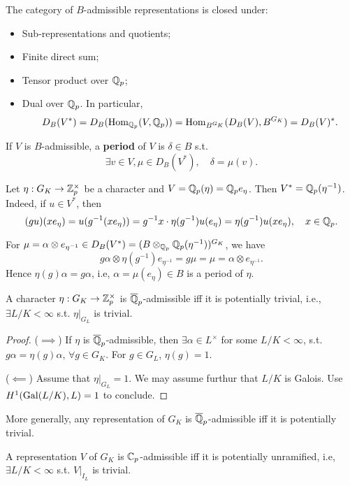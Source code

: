 The category of $B$-admissible representations is closed under:\begin{itemize}
\item Sub-representations and quotients;
\item Finite direct sum;
\item Tensor product over $\mathbb{Q}_p$;
\item Dual over $\mathbb{Q}_p$. In particular, \[D_B(V^*) = D_B(\operatorname{Hom}_{\mathbb{Q}_p}(V, \mathbb{Q}_p)) =\operatorname{Hom}_{B^{G_K}}(D_B(V), B^{G_K}) = D_B(V)^*.\]
\end{itemize}

If $V$ is $B$-admissible, a \textbf{period} of $V$ is $\delta\in B$ s.t. \[\exists v\in V, \mu\in D_B(V^*),\quad \delta = \mu(v).\]
\begin{example}
    Let $\eta : G_K\to\mathbb{Z}_p^{\times}$ be a character and $V = \mathbb{Q}_p(\eta) = \mathbb{Q}_pe_\eta$.
    Then $V^* = \mathbb{Q}_p(\eta^{-1})$.
    Indeed, if $u\in V^*$, then
    \[(gu)(xe_\eta) = u(g^{-1}(x e_\eta))
    = g^{-1}x\cdot \eta(g^{-1})u(e_\eta)=\eta(g^{-1})u(xe_\eta),\quad x\in \mathbb{Q}_p.\]

    For $\mu = \alpha\otimes e_{\eta^{-1}}\in D_B(V^*) = (B\otimes_{\mathbb{Q}_p} \mathbb{Q}_p(\eta^{-1}))^{G_K}$,
    we have \[
    g\alpha\otimes \eta(g^{-1})e_{\eta^{-1}} = g\mu
    = \mu = \alpha\otimes e_{\eta^{-1}}.\]
    Hence $\eta(g)\alpha = g\alpha$,
    i.e, $\alpha = \mu(e_\eta)\in B$ is a period of $\eta$. 
\end{example}

\begin{proposition}
    A character $\eta : G_K\to\mathbb{Z}_p^\times$ is $\overline{\mathbb{Q}}_p$-admissible iff it is potentially trivial, i.e., $\exists L/K<\infty$ s.t. $\eta|_{G_L}$ is trivial.
\end{proposition}
\begin{proof}
    ($\implies$) If $\eta$ is $\overline{\mathbb{Q}}_p$-admissible,
    then $\exists \alpha\in L^\times$ for some $L/K<\infty$, s.t. $g\alpha = \eta(g)\alpha$,
    $\forall g\in G_K$.
    For $g\in G_L$, $\eta(g) = 1$.

    ($\impliedby$) Assume that $\eta|_{G_L} = 1$.
    We may assume furthur that $L/K$ is Galois.
    Use $H^1(\operatorname{Gal}(L/K), L) = 1$ to conclude.
\end{proof}
More generally, any representation of $G_K$ is $\overline{\mathbb{Q}}_p$-admissible iff it is potentially trivial.

\begin{theorem}[Sen]
    A representation $V$ of $G_K$ is $\mathbb{C}_p$-admissible iff it is potentially unramified, i.e, $\exists L/K < \infty$
    s.t. $V|_{I_L}$ is trivial.
\end{theorem}

